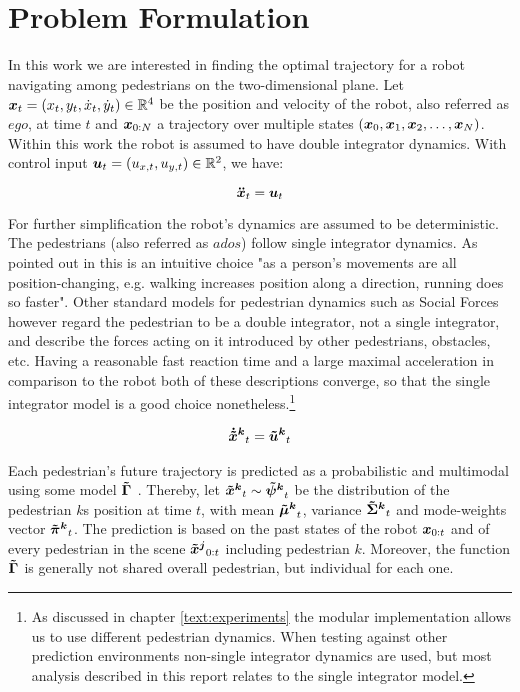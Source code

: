 \section{Problem Formulation}
\label{text:approach/formulation}
In this work we are interested in finding the optimal trajectory for a robot navigating among pedestrians on the two-dimensional plane. Let $\boldsymbol{x}_t = (x_t, y_t, \dot{x}_t, \dot{y}_t) \in \mathbb{R}^4 $ be the position and velocity of the robot, also referred as $ego$, at time $t$ and $\boldsymbol{x}_{0:N}$ a trajectory over multiple states $(\boldsymbol{x}_0, \boldsymbol{x}_1, \boldsymbol{x}_2, \hdots, \boldsymbol{x}_N)$. Within this work the robot is assumed to have double integrator dynamics. With control input $\boldsymbol{u}_t = (u_{x, t}, u_{y, t}) \in \mathbb{R}^2$, we have: 

\begin{equation}
\boldsymbol{\ddot{x}}_t = \boldsymbol{u}_t
\label{eq:robot_dynamics}
\end{equation}

For further simplification the robot's dynamics are assumed to be deterministic. 
The pedestrians (also referred as $ados$) follow single integrator dynamics. As pointed out in \cite{Ivanovic18} this is an intuitive choice "as a person’s movements are all position-changing, e.g. walking increases position along a direction, running does so faster". Other standard models for pedestrian dynamics such as Social Forces \cite{Helbling1995} however regard the pedestrian to be a double integrator, not a single integrator, and describe the forces acting on it introduced by other pedestrians, obstacles, etc. Having a reasonable fast reaction time and a large maximal acceleration in comparison to the robot both of these descriptions converge, so that the single integrator model is a good choice nonetheless.\footnote{As discussed in chapter \ref{text:experiments} the modular implementation allows us to use different pedestrian dynamics. When testing against other prediction environments non-single integrator dynamics are used, but most analysis described in this report relates to the single integrator model.} 

\begin{align}
\dxped[k]_t = \uped[k]_t
\label{eq:pedestrian_dynamics}
\end{align}

Each pedestrian's future trajectory is predicted as a probabilistic and multimodal using some model $\distmodel[]$ . Thereby,  let $\xped[k]_t \sim \dist[k]_t$ be the distribution of the pedestrian $k$s position at time $t$, with mean $\muped[k]_t$, variance $\sigmaped[k]_t$ and mode-weights vector $\piped[k]_t$. The prediction is based on the past states of the robot $\boldsymbol{x}_{0:t}$ and of every pedestrian in the scene $\xped[j]_{0:t}$ including pedestrian $k$. Moreover, the function $\distmodel[]$ is generally not shared overall pedestrian, but individual for each one.


